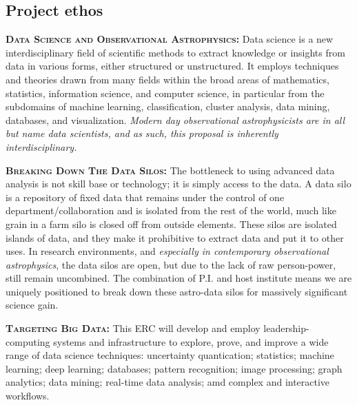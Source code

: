 \subsection{Project ethos}
\smallskip
\smallskip
\noindent
\textbf{\textsc{{Data Science and Observational Astrophysics: }}}
Data science is a new interdisciplinary field of scientific methods to
extract knowledge or insights from data in various forms, either
structured or unstructured. It employs techniques and theories drawn
from many fields within the broad areas of mathematics, statistics,
information science, and computer science, in particular from the
subdomains of machine learning, classification, cluster analysis, data
mining, databases, and visualization.  {\it Modern day observational
astrophysicists are in all but name data scientists, and as such, this
proposal is inherently interdisciplinary.}

\smallskip
\smallskip
\noindent
\textbf{\textsc{Breaking Down The Data Silos: }}
The bottleneck to using advanced data analysis is not skill base or
technology; it is simply access to the data.  A data silo is a
repository of fixed data that remains under the control of one
department/collaboration and is isolated from the rest of the world,
much like grain in a farm silo is closed off from outside
elements. These silos are isolated islands of data, and they make it
prohibitive to extract data and put it to other uses. In research
environments, and {\it especially in contemporary observational
astrophysics}, the data silos are open, but due to the lack of raw
person-power, still remain uncombined. The combination of P.I. and
host institute means we are uniquely positioned to break down these
astro-data silos for massively significant science gain.

\smallskip
\smallskip
\noindent
\textbf{\textsc{Targeting Big Data: }}
This ERC will develop and employ leadership-computing systems and
infrastructure to explore, prove, and improve a wide range of data
science techniques: uncertainty quantication; statistics; machine
learning; deep learning; databases; pattern recognition; image
processing; graph analytics; data mining; real-time data analysis; amd
complex and interactive workflows.

